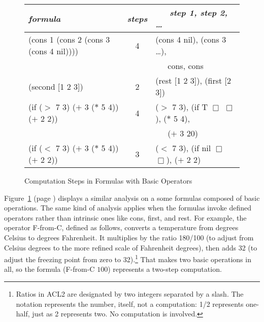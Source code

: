 \begin{figure}
\begin{center}
\begin{tabular}{lcl}
\hline
\hspace*{5mm}\emph{formula}                         &\emph{steps}&~~~\emph{step 1, step 2, \dots}\\ \hline
\textsf{(cons 1 (cons 2 (cons 3 (cons 4 nil))))}    &     4      &\textsf{(cons 4 nil)}, \textsf{(cons 3 \dots)},\\
                                                    &            &~~~\textsf{cons}, \textsf{cons}\\
\textsf{(second [1 2 3])}                           &     2      &\textsf{(rest [1 2 3])}, \textsf{(first [2 3])}\\
\textsf{(if ($>$ 7 3) ($+$ 3 ($*$ 5 4)) ($+$ 2 2))} &     4      &\textsf{($>$ 7 3)}, \textsf{(if T $\Box$ $\Box$)}, \textsf{($*$ 5 4)},\\
                                                    &            &~~~\textsf{($+$ 3 20)}\\
\textsf{(if ($<$ 7 3) ($+$ 3 ($*$ 5 4)) ($+$ 2 2))} &     3      &\textsf{($<$ 7 3)}, \textsf{(if nil $\Box$ $\Box$)}, \textsf{($+$ 2 2)}\\
\end{tabular}
\end{center}
\caption{Computation Steps in Formulas with Basic Operators}
\label{fig:basic-op-formulas}
\end{figure}

Figure~\ref{fig:basic-op-formulas} (page \pageref{fig:basic-op-formulas})
displays a similar analysis on a some formulas
composed of basic operations. The same kind of
analysis applies when the formulas invoke defined operators
rather than intrinsic ones like
\textsf{cons}, \textsf{first}, and \textsf{rest}.
For example, the operator \textsf{F-from-C}, defined
as follows, converts a temperature from degrees Celsius to
degrees Fahrenheit. It multiplies by the ratio \textsf{180/100}
(to adjust from Celsius degrees to the
more refined scale of Fahrenheit degrees), then adds 32
(to adjust the freezing point from zero to 32).\footnote{Ratios
in ACL2 are designated
by two integers separated by a slash.
The notation represents the number, itself, not a computation:
\textsf{1/2} represents one-half, just as \textsf{2} represents two.
No computation is involved.}
That makes two basic operations in all, so the formula
\textsf{(F-from-C $100$)} represents a two-step computation.

